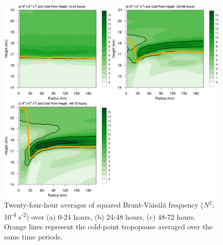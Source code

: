\documentclass{ametsoc}
\begin{document}
\begin{figure}[ht]
\centerline{\includegraphics[width=39pc]{figures/n2-24hr-avgs.png}}
\caption{Twenty-four-hour averages of squared Brunt-V{\"a}is{\"a}l{\"a} frequency ($N^2$; 10\textsuperscript{-4} s\textsuperscript{-2}) over (a) 0-24 hours, (b) 24-48 hours, (c) 48-72 hours.
Orange lines represent the cold-point tropopause averaged over the same time periods.}
\label{fig:n2-24hr-avgs}
\end{figure}
\end{document}
